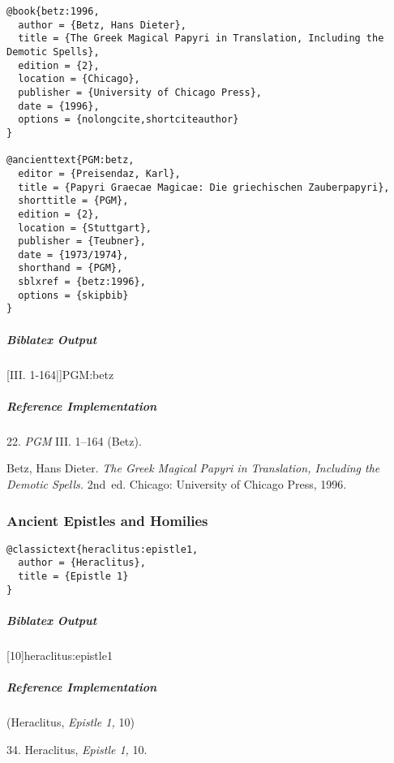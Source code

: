 \documentclass[a4paper]{article}
\newenvironment{biboutput}{%
  \subparagraph{Biblatex Output}
}{\color{black}}
\newenvironment{refimp}{%
  \subparagraph{Reference Implementation}
  \color{reference-colour}
  \rm
}{\par\color{black}}
\begin{document}
\begin{lstlisting}
@book{betz:1996,
  author = {Betz, Hans Dieter},
  title = {The Greek Magical Papyri in Translation, Including the Demotic Spells},
  edition = {2},
  location = {Chicago},
  publisher = {University of Chicago Press},
  date = {1996},
  options = {nolongcite,shortciteauthor}
}

@ancienttext{PGM:betz,
  editor = {Preisendaz, Karl},
  title = {Papyri Graecae Magicae: Die griechischen Zauberpapyri},
  shorttitle = {PGM},
  edition = {2},
  location = {Stuttgart},
  publisher = {Teubner},
  date = {1973/1974},
  shorthand = {PGM},
  sblxref = {betz:1996},
  options = {skipbib}
}
\end{lstlisting}

\begin{biboutput}
  [III. 1-164|]{PGM:betz}
\end{biboutput}

\begin{refimp}
  \hspace*{\bibindent}22. \emph{PGM} III. 1–164 (Betz).

  \hangindent\bibindent Betz, Hans Dieter. \emph{The Greek Magical Papyri in
  Translation, Including the Demotic Spells.} 2nd~ed. Chicago: University of
  Chicago Press, 1996.

\end{refimp}

\subsubsection{Ancient Epistles and Homilies}

\begin{lstlisting}
@classictext{heraclitus:epistle1,
  author = {Heraclitus},
  title = {Epistle 1}
}
\end{lstlisting}

\begin{biboutput}
  [10]{heraclitus:epistle1}
\end{biboutput}

\begin{refimp}
  (Heraclitus, \emph{Epistle 1,} 10)

  \hspace*{\bibindent}34. Heraclitus, \emph{Epistle 1,} 10.
\end{refimp}
\end{document}
